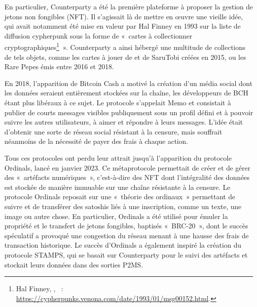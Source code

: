 En particulier, Counterparty a été la première plateforme à proposer la gestion de jetons non fongibles (NFT). Il s'agissait là de mettre en œuvre une vieille idée, qui avait notamment été mise en valeur par Hal Finney en 1993 sur la liste de diffusion cypherpunk sous la forme de «~cartes à collectionner cryptographiques\footnote{Hal Finney, , ~: \url{https://cypherpunks.venona.com/date/1993/01/msg00152.html}.}~». Counterparty a ainsi hébergé une multitude de collections de tels objets, comme les cartes à jouer de  et de SaruTobi créées en 2015, ou les Rare Pepes émis entre 2016 et 2018.

En 2018, l'apparition de Bitcoin Cash a motivé la création d'un média social dont les données seraient entièrement stockées sur la chaîne, les développeurs de BCH étant plus libéraux à ce sujet. Le protocole s'appelait Memo et consistait à publier de courts messages visibles publiquement sous un profil défini et à pouvoir suivre les autres utilisateurs, à aimer et répondre à leurs messages. L'idée était d'obtenir une sorte de réseau social résistant à la censure, mais souffrait néanmoins de la nécessité de payer des frais à chaque action. 

Tous ces protocoles ont perdu leur attrait jusqu'à l'apparition du protocole Ordinals, lancé en janvier 2023. Ce métaprotocole permettait de créer et de gérer des «~artéfacts numériques~», c'est-à-dire des NFT dont l'intégralité des données est stockée de manière immuable sur une chaîne résistante à la censure. Le protocole Ordinals reposait sur une «~théorie des ordinaux~» permettant de suivre et de transférer des satoshis liés à une inscription, comme un texte, une image ou autre chose. En particulier, Ordinals a été utilisé pour émuler la propriété et le transfert de jetons fongibles, baptisés «~BRC-20~», dont le succès spéculatif a provoqué une congestion du réseau menant à une hausse des frais de transaction historique. Le succès d'Ordinals a également inspiré la création du protocole STAMPS, qui se basait sur Counterparty pour le suivi des artéfacts et stockait leurs données dans des sorties P2MS.

